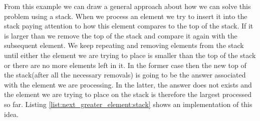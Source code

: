 From this example we can draw a general approach about how we can solve this problem using a stack. 
When we process an element we try to insert it into the stack paying attention to how this element compares to the top of the stack.
If it is larger than we remove the top of the stack and compare it again with the subsequent element. 
We keep repeating and removing elements from the stack until either the element we are 
trying to place is smaller than the top of the stack or there are no more elements left in it.
In the former case then the new top  of the stack(after all the necessary removals)
is going to be the answer associated with the element we are processing.
In the latter, the answer does not exists and the element we are trying to place on the stack
is therefore the largest processed so far.
Listing \ref{list:next_greater_element:stack} shows an implementation of this idea.





